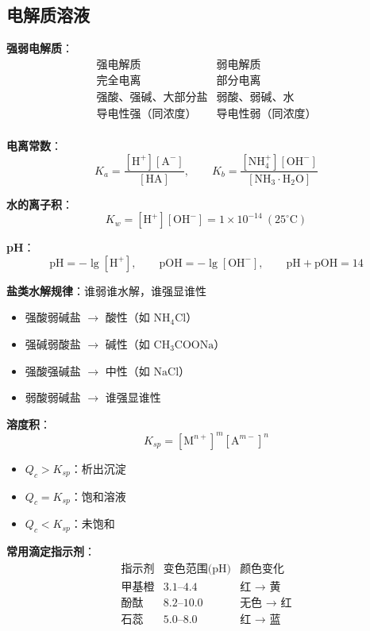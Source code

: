 \subsection{电解质溶液}

\textbf{强弱电解质}：
\[
\begin{array}{c|c}
\text{强电解质} & \text{弱电解质} \\ \hline
\text{完全电离} & \text{部分电离} \\
\text{强酸、强碱、大部分盐} & \text{弱酸、弱碱、水} \\
\text{导电性强（同浓度）} & \text{导电性弱（同浓度）} \\
\end{array}
\]

\textbf{电离常数}：
\[
K_a = \frac{[\text{H}^+][\text{A}^-]}{[\text{HA}]},\qquad K_b = \frac{[\text{NH}_4^+][\text{OH}^-]}{[\text{NH}_3\cdot\text{H}_2\text{O}]}
\]

\textbf{水的离子积}：
\[
K_w = [\text{H}^+][\text{OH}^-] = 1\times10^{-14}\ (25^\circ\text{C})
\]

\textbf{pH}：
\[
\text{pH} = -\lg[\text{H}^+],\qquad \text{pOH} = -\lg[\text{OH}^-],\qquad \text{pH}+\text{pOH}=14
\]

\textbf{盐类水解规律}：谁弱谁水解，谁强显谁性
\begin{itemize}
  \item 强酸弱碱盐 $\to$ 酸性（如 $\text{NH}_4\text{Cl}$）
  \item 强碱弱酸盐 $\to$ 碱性（如 $\text{CH}_3\text{COONa}$）
  \item 强酸强碱盐 $\to$ 中性（如 $\text{NaCl}$）
  \item 弱酸弱碱盐 $\to$ 谁强显谁性
\end{itemize}

\textbf{溶度积}：
\[
K_{sp} = [\text{M}^{n+}]^m[\text{A}^{m-}]^n
\]
\begin{itemize}
  \item $Q_c > K_{sp}$：析出沉淀
  \item $Q_c = K_{sp}$：饱和溶液
  \item $Q_c < K_{sp}$：未饱和
\end{itemize}

\textbf{常用滴定指示剂}：
\[
\begin{array}{c|c|c}
\text{指示剂} & \text{变色范围(pH)} & \text{颜色变化} \\ \hline
\text{甲基橙} & 3.1\text{--}4.4 & \text{红 $\to$ 黄} \\
\text{酚酞} & 8.2\text{--}10.0 & \text{无色 $\to$ 红} \\
\text{石蕊} & 5.0\text{--}8.0 & \text{红 $\to$ 蓝} \\
\end{array}
\]

